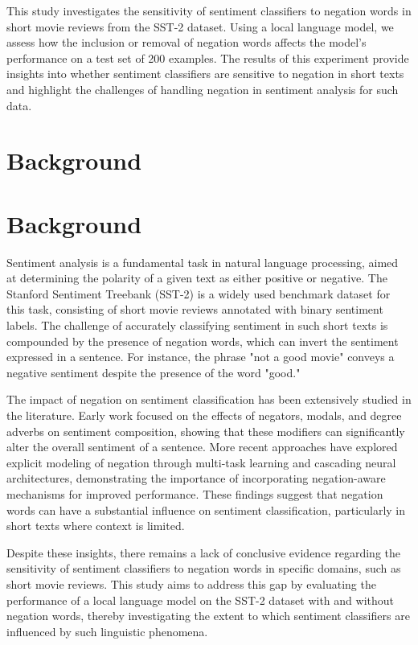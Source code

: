 \documentclass{article}
\begin{document}
This study investigates the sensitivity of sentiment classifiers to negation words in short movie reviews from the SST-2 dataset. Using a local language model, we assess how the inclusion or removal of negation words affects the model's performance on a test set of 200 examples. The results of this experiment provide insights into whether sentiment classifiers are sensitive to negation in short texts and highlight the challenges of handling negation in sentiment analysis for such data.
\section{Background}
\section{Background}

Sentiment analysis is a fundamental task in natural language processing, aimed at determining the polarity of a given text as either positive or negative. The Stanford Sentiment Treebank (SST-2) is a widely used benchmark dataset for this task, consisting of short movie reviews annotated with binary sentiment labels. The challenge of accurately classifying sentiment in such short texts is compounded by the presence of negation words, which can invert the sentiment expressed in a sentence. For instance, the phrase "not a good movie" conveys a negative sentiment despite the presence of the word "good." 

The impact of negation on sentiment classification has been extensively studied in the literature. Early work focused on the effects of negators, modals, and degree adverbs on sentiment composition, showing that these modifiers can significantly alter the overall sentiment of a sentence. More recent approaches have explored explicit modeling of negation through multi-task learning and cascading neural architectures, demonstrating the importance of incorporating negation-aware mechanisms for improved performance. These findings suggest that negation words can have a substantial influence on sentiment classification, particularly in short texts where context is limited. 

Despite these insights, there remains a lack of conclusive evidence regarding the sensitivity of sentiment classifiers to negation words in specific domains, such as short movie reviews. This study aims to address this gap by evaluating the performance of a local language model on the SST-2 dataset with and without negation words, thereby investigating the extent to which sentiment classifiers are influenced by such linguistic phenomena.
\end{document}
